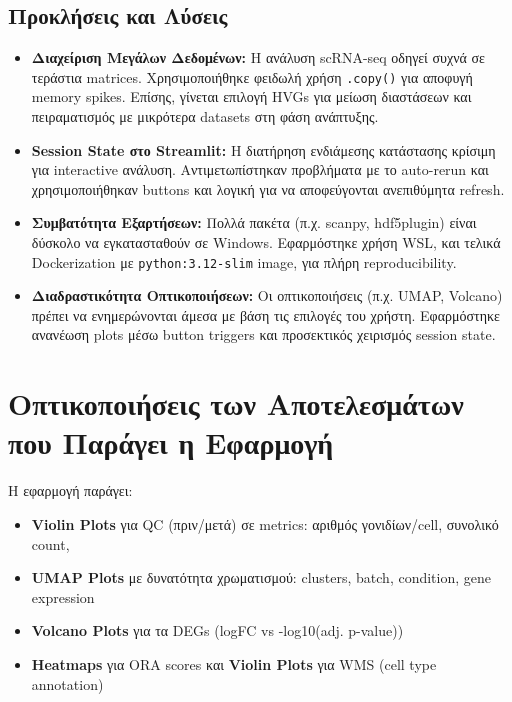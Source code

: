 \documentclass[12pt, a4paper]{article}
\begin{document}
\subsection{Προκλήσεις και Λύσεις}
\begin{itemize}
    \item \textbf{Διαχείριση Μεγάλων Δεδομένων:} Η ανάλυση scRNA-seq οδηγεί συχνά σε τεράστια matrices. Χρησιμοποιήθηκε φειδωλή χρήση \texttt{.copy()} για αποφυγή memory spikes. Επίσης, γίνεται επιλογή HVGs για μείωση διαστάσεων και πειραματισμός με μικρότερα datasets στη φάση ανάπτυξης.
    \item \textbf{Session State στο Streamlit:} Η διατήρηση ενδιάμεσης κατάστασης κρίσιμη για interactive ανάλυση. Αντιμετωπίστηκαν προβλήματα με το auto-rerun και χρησιμοποιήθηκαν buttons και λογική για να αποφεύγονται ανεπιθύμητα refresh.
    \item \textbf{Συμβατότητα Εξαρτήσεων:} Πολλά πακέτα (π.χ. scanpy, hdf5plugin) είναι δύσκολο να εγκατασταθούν σε Windows. Εφαρμόστηκε χρήση WSL, και τελικά Dockerization με \texttt{python:3.12-slim} image, για πλήρη reproducibility.
    \item \textbf{Διαδραστικότητα Οπτικοποιήσεων:} Οι οπτικοποιήσεις (π.χ. UMAP, Volcano) πρέπει να ενημερώνονται άμεσα με βάση τις επιλογές του χρήστη. Εφαρμόστηκε ανανέωση plots μέσω button triggers και προσεκτικός χειρισμός session state.
\end{itemize}

\section{Οπτικοποιήσεις των Αποτελεσμάτων που Παράγει η Εφαρμογή}
\label{sec:visualizations}
Η εφαρμογή παράγει:
\begin{itemize}
    \item \textbf{Violin Plots} για QC (πριν/μετά) σε metrics: αριθμός γονιδίων/cell, συνολικό count, %
    \item \textbf{UMAP Plots} με δυνατότητα χρωματισμού: clusters, batch, condition, gene expression
    \item \textbf{Volcano Plots} για τα DEGs (logFC vs -log10(adj. p-value))
    \item \textbf{Heatmaps} για ORA scores και \textbf{Violin Plots} για WMS (cell type annotation)
\end{itemize}

\end{document}
